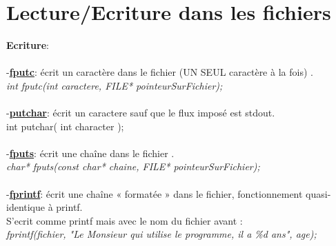 \documentclass[a4paper,12pt,openany]{book}
\begin{document}
\section{Lecture/Ecriture dans les fichiers}

\textbf{Ecriture}: \\
\\
-\underline{\textbf{fputc}}: écrit un caractère dans le fichier (UN SEUL caractère à la fois) .\\
\emph{int fputc(int caractere, FILE* pointeurSurFichier);}\\
\\
-\underline{\textbf{putchar}}: écrit un caractere sauf que le flux imposé est stdout.\\
int putchar( int character );\\
\\
-\underline{\textbf{fputs}}: écrit une chaîne dans le fichier .\\
\emph{char* fputs(const char* chaine, FILE* pointeurSurFichier);}\\
\\
-\underline{\textbf{fprintf}}: écrit une cha\^ine « format\'ee » dans le fichier, fonctionnement quasi-identique \`a printf.\\
S'ecrit comme printf mais avec le nom du fichier avant :\\
\emph{fprintf(fichier, "Le Monsieur qui utilise le programme, il a \%d ans", age);}\\
\\
\end{document}

